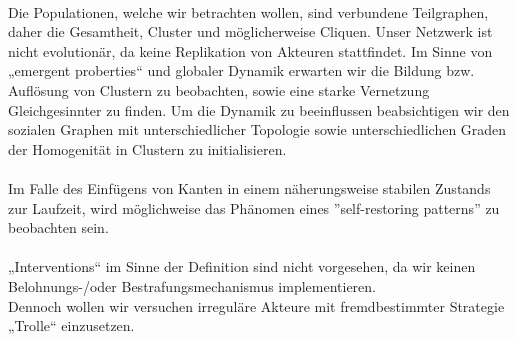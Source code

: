 \documentclass[11pt, a4paper]{scrartcl}
\begin{document}
\\
Die Populationen, welche wir betrachten wollen, sind verbundene Teilgraphen, daher die Gesamtheit, Cluster und möglicherweise Cliquen.
Unser Netzwerk ist nicht evolutionär, da keine Replikation von Akteuren stattfindet.
Im Sinne von „emergent proberties“ und globaler Dynamik erwarten wir die Bildung bzw. Auflösung von Clustern zu beobachten, sowie eine starke Vernetzung Gleichgesinnter zu finden.
Um die Dynamik zu beeinflussen beabsichtigen wir den sozialen Graphen mit unterschiedlicher Topologie sowie unterschiedlichen Graden der Homogenität in Clustern zu initialisieren.\\
\\
Im Falle des Einfügens von Kanten in einem näherungsweise stabilen Zustands zur Laufzeit, wird möglichweise das Phänomen eines ''self-restoring patterns'' zu beobachten sein.\\
 \\
„Interventions“ im Sinne der Definition sind nicht vorgesehen, da wir keinen Belohnungs-/oder Bestrafungsmechanismus implementieren.\\
Dennoch wollen wir versuchen irreguläre Akteure mit fremdbestimmter Strategie „Trolle“ einzusetzen.
\end{document}
